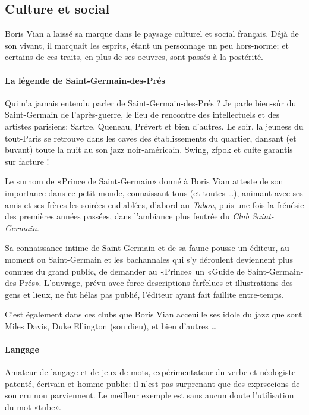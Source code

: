 \documentclass[twoside]{book}
\begin{document}
\subsection{Culture et social}

Boris Vian a laissé sa marque dans le paysage culturel et social français. Déjà
de son vivant, il marquait les esprits, étant un personnage un peu hors-norme; et
certains de ces traits, en plus de ses oeuvres, sont passés à la postérité.

\paragraph{La légende de Saint-Germain-des-Prés}

Qui n'a jamais entendu parler de Saint-Germain-des-Prés ? Je parle bien-sûr
du Saint-Germain de l'après-guerre, le lieu de rencontre des intellectuels et
des artistes parisiens: Sartre, Queneau, Prévert %
et bien d'autres. Le soir, la jeuness du tout-Paris se retrouve dans les caves
des établissements du quartier, dansant (et buvant) toute la nuit au son jazz
noir-américain. Swing, zfpok et cuite garantis sur facture !

Le surnom de «Prince de Saint-Germain» donné à Boris Vian atteste de son importance
dans ce petit monde, connaissant tous (et toutes \ldots), animant avec ses amis et
ses frères les soirées endiablées, d'abord au \emph{Tabou}, puis une fois la
frénésie des premières années passées, dans l'ambiance plus feutrée du \emph{Club
Saint-Germain}.

Sa connaissance intime de Saint-Germain et de sa faune pousse un éditeur, au moment
ou Saint-Germain et les bachannales qui s'y déroulent deviennent plus connues du
grand public, de demander au «Prince» un «Guide de Saint-Germain-des-Prés».
L'ouvrage, prévu avec force descriptions farfelues et illustrations des gens et
lieux, ne fut hélas pas publié, l'éditeur ayant fait faillite entre-temps.

C'est également dans ces clubs que Boris Vian acceuille ses idole du jazz que sont
Miles Davis, Duke Ellington (son dieu), et bien d'autres \ldots

\paragraph{Langage}

Amateur de langage et de jeux de mots, expérimentateur du verbe et néologiste
patenté, écrivain et homme public: il n'est pas surprenant que des exprseeions
de son cru nou parviennent.
Le meilleur exemple est sans aucun doute l'utilisation du mot «tube».
\end{document}
